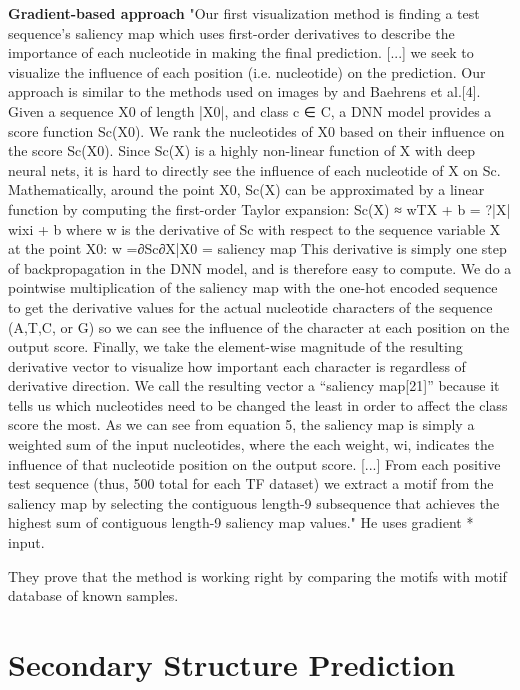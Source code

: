 		\textbf{Gradient-based approach}
		"Our first visualization method is finding a test sequence’s saliency map which uses first-order derivatives to describe the importance of each nucleotide in making the final prediction. [...] we seek to visualize the influence of each position (i.e. nucleotide) on the prediction. Our approach is similar to the methods used on images by \cite{Simonyan2014} and Baehrens et al.[4]. Given a sequence X0 of length |X0|, and class c ∈ C, a DNN model provides a score function Sc(X0). We rank the nucleotides of X0 based on their influence on the score Sc(X0). Since Sc(X) is a highly non-linear function of X with deep neural nets, it is hard to directly see the influence of each nucleotide of X on Sc. Mathematically, around the point X0, Sc(X) can be approximated by a linear function by computing the first-order Taylor expansion:
		Sc(X) ≈ wTX + b = ?|X| wixi + b
		where w is the derivative of Sc with respect to the sequence variable X at the point X0:
		w =∂Sc∂X|X0 = saliency map
		This derivative is simply one step of backpropagation in the DNN model, and is therefore easy to compute. We do a pointwise multiplication of the saliency map with the one-hot encoded sequence to get the derivative values for the actual nucleotide characters of the sequence (A,T,C, or G) so we can see the influence of the character at each position on the output score. Finally, we take the element-wise magnitude of the resulting derivative vector to visualize how important each character is regardless of derivative direction. We call the resulting vector a “saliency map[21]” because it tells us which nucleotides need to be changed the least in order to affect the class score the most. As we can see from equation 5, the saliency map is simply a weighted sum of the input nucleotides, where the each weight, wi, indicates the influence of that nucleotide position on the output score.
		[...]
		From each positive test sequence (thus, 500 total for each TF dataset) we extract a motif from the saliency map by selecting the contiguous length-9 subsequence that achieves the highest sum of contiguous length-9 saliency map values." \cite{Lanchantin2016}
		He uses gradient * input.
		
		They prove that the method is working right by comparing the motifs with motif database of known samples.
		
			
\section{Secondary Structure Prediction}

